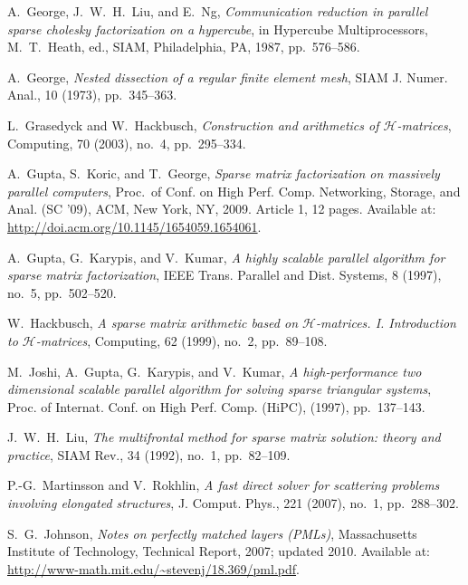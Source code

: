 \begin{thebibliography}{10}
{\sc A.~George, J.~W.~H.~Liu, and E.~Ng},
{\em Communication reduction in parallel sparse cholesky factorization on a 
 hypercube},
in Hypercube Multiprocessors, M.~T.~Heath, ed., SIAM, Philadelphia, PA, 1987,
pp.~576--586.

{\sc A.~George},
{\em Nested dissection of a regular finite element mesh},
SIAM J. Numer. Anal., 10 (1973), pp.~345--363.

{\sc L.~Grasedyck and W.~Hackbusch},
{\em Construction and arithmetics of $\mathcal{H}$-matrices},
Computing, 70 (2003), no.~4, pp.~295--334.

{\sc A.~Gupta, S.~Koric, and T.~George},
{\em Sparse matrix factorization on massively parallel computers},
Proc.\ of Conf. on High Perf. Comp. Networking, Storage, and Anal. (SC '09),
ACM, New York, NY, 2009. Article 1, 12 pages. Available at: 
\url{http://doi.acm.org/10.1145/1654059.1654061}.

{\sc A.~Gupta, G.~Karypis, and V.~Kumar},
{\em A highly scalable parallel algorithm for sparse matrix factorization},
IEEE Trans. Parallel and Dist. Systems, 8 (1997), no.~5, pp.~502--520.

{\sc W.~Hackbusch},
{\em A sparse matrix arithmetic based on $\mathcal{H}$-matrices. I. Introduction
 to $\mathcal{H}$-matrices}, 
Computing, 62 (1999), no.~2, pp.~89--108.

{\sc M.~Joshi, A.~Gupta, G.~Karypis, and V.~Kumar},
{\em A high-performance two dimensional scalable parallel algorithm for solving 
 sparse triangular systems},
Proc. of Internat. Conf. on High Perf. Comp. (HiPC), (1997), pp.~137--143.

{\sc J.~W.~H.~Liu},
{\em The multifrontal method for sparse matrix solution: theory and practice},
SIAM Rev., 34 (1992), no.~1, pp.~82--109.

{\sc P.-G.~Martinsson and V.~Rokhlin},
{\em A fast direct solver for scattering problems involving elongated 
 structures},
J. Comput. Phys., 221 (2007), no.~1, pp.~288--302.

{\sc S.~G.~Johnson}, 
{\em Notes on perfectly matched layers (PMLs)}, 
Massachusetts Institute of Technology, Technical Report, 2007; updated 2010. 
Available at: \url{http://www-math.mit.edu/~stevenj/18.369/pml.pdf}.


\end{thebibliography}
